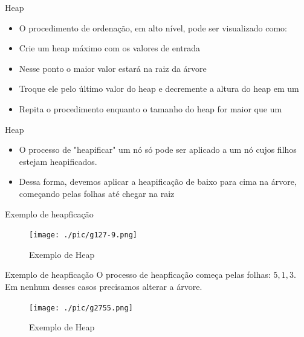 \begin{frame}
	\begin{block}{Heap}
		\begin{itemize}
			\item O procedimento de ordenação, em alto nível, pode ser visualizado como:
			\item Crie um heap máximo com os valores de entrada
			\item Nesse ponto o maior valor estará na raiz da árvore
			\item Troque ele pelo último valor do heap e decremente a altura do heap em um
			\item Repita o procedimento enquanto o tamanho do heap for maior que um
		\end{itemize}
	\end{block}
\end{frame}


\begin{frame}
	\begin{block}{Heap}
		\begin{itemize}
			\item O processo de "heapificar" um nó só pode ser aplicado a um nó cujos filhos estejam heapificados. 
			\item Dessa forma, devemos aplicar a heapificação de baixo para cima na árvore, começando pelas folhas até chegar na raiz
		\end{itemize}
	\end{block}
\end{frame}

\begin{frame}
	\begin{block}{Exemplo de heapficação}
		\begin{figure}[!htb]
			\centering	  				
			\texttt{[image: ./pic/g127-9.png]}
			\caption{Exemplo de Heap}
		\end{figure}
	\end{block}
\end{frame}

\begin{frame}
	\begin{block}{Exemplo de heapficação}
		O processo de heapficação começa pelas folhas: $5,1,3$. 
		Em nenhum desses casos precisamos alterar a árvore.
		\begin{figure}[!htb]
			\centering	  				
			\texttt{[image: ./pic/g2755.png]}
			\caption{Exemplo de Heap}
		\end{figure}
	\end{block}
\end{frame}


